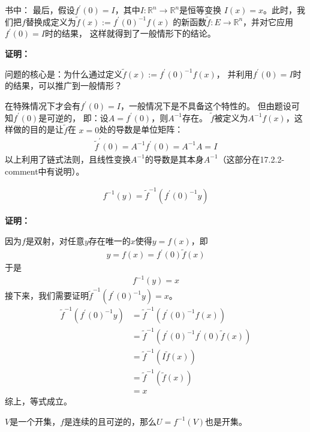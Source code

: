 \documentclass{article}
\begin{document}
\begin{zremark}
  书中：
  最后，假设$f^\prime(0) = I$，其中$I: \mathbb{R}^n \to \mathbb{R}^n$是恒等变换
  $I(x) = x$。此时，我们把$f$替换成定义为$\tilde{f}(x) := f^\prime(0)^{-1}f(x)$
  的新函数$\tilde{f} : E \to \mathbb{R}^n$，并对它应用$f^\prime(0) = I$时的结果，
  这样就得到了一般情形下的结论。
\end{zremark}

\textbf{证明：}

问题的核心是：为什么通过定义$\tilde{f}(x) := f^\prime(0)^{-1}f(x)$，
并利用$f^\prime(0) = I$时的结果，可以推广到一般情形？

在特殊情况下才会有$f^\prime(0) = I$，一般情况下是不具备这个特性的。
但由题设可知$f^\prime(0)$是可逆的，
即：设$A = f^\prime(0)$，则$A^{-1}$存在。
$\tilde{f}$被定义为$A^{-1}f(x)$，这样做的目的是让$\tilde{f}$在
$x = 0$处的导数是单位矩阵：
\begin{align*}
  \tilde{f}^\prime(0) = A^{-1}f^\prime(0) = A^{-1}A = I
\end{align*}
以上利用了链式法则，且线性变换$A^{-1}$的导数是其本身$A^{-1}$（这部分在17.2.2-comment中有说明）。

\begin{zremark}
  \begin{align*}
    f^{-1}(y) = \tilde{f}^{-1}(f^\prime(0)^{-1}y)
  \end{align*}
\end{zremark}

\textbf{证明：}

因为$f$是双射，对任意$y$存在唯一的$x$使得$y = f(x)$，即
\begin{align*}
  y = f(x) = f^\prime(0)\tilde{f}(x)
\end{align*}
于是
\begin{align*}
  f^{-1}(y) = x
\end{align*}
接下来，我们需要证明$\tilde{f}^{-1}(f^\prime(0)^{-1}y) = x$。
\begin{align*}
  \tilde{f}^{-1}(f^\prime(0)^{-1}y)
   & = \tilde{f}^{-1}(f^\prime(0)^{-1}f(x))                    \\
   & = \tilde{f}^{-1}(f^\prime(0)^{-1}f^\prime(0)\tilde{f}(x)) \\
   & = \tilde{f}^{-1}(I \tilde{f}(x))                          \\
   & = \tilde{f}^{-1}(\tilde{f}(x))                            \\
   & = x
\end{align*}
综上，等式成立。

\begin{zremark}
  $V$是一个开集，$f$是连续的且可逆的，那么$U = f^{-1}(V)$也是开集。
\end{zremark}
\end{document}
